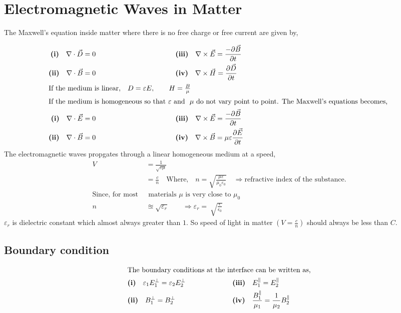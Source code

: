 \section{Electromagnetic Waves in Matter}
The Maxwell's equation inside matter where there is no free charge or free current are given by,

\begin{align*}
\textbf{(i)}\quad \nabla\cdot \vec{D}=0&\hspace{4cm}\textbf{(iii)} \quad\nabla\times \vec{E}=\frac{-\partial \vec{B}}{\partial t}\\
\textbf{(ii)}\quad\nabla\cdot \vec{B}=0&\hspace{4cm}\textbf{(iv)}\quad\nabla\times \vec{H}=\frac{\partial \vec{D}}{\partial t}\\
\intertext{If the medium is linear,\quad $ D=\varepsilon E,\qquad H=\frac{B}{\mu} $}
\intertext{If the medium is homogeneous so that $ \varepsilon $\ and \ $ \mu$\ do not vary point to point. The Maxwell's equations becomes, }
\textbf{(i)}\quad \nabla\cdot \vec{E}=0&\hspace{4cm}\textbf{(iii)} \quad\nabla\times \vec{E}=\frac{-\partial \vec{B}}{\partial t}\\
\textbf{(ii)}\quad\nabla\cdot \vec{B}=0&\hspace{4cm}\textbf{(iv)}\quad\nabla\times \vec{B}= \mu \varepsilon\frac{\partial \vec{E}}{\partial t}
\end{align*}
The electromagnetic waves propgates through a linear homogeneous medium at a speed,
\begin{align*}
V&=\frac{1}{\sqrt{\varepsilon\mu}}\\
&=\frac{c}{n}\quad\text{Where,}\quad n= \sqrt{\frac{\mu \varepsilon}{\mu_0 \varepsilon_0}} \quad \Rightarrow \text{refractive index of the substance.}\\
\text{Since, for most   }&\text{ materials \ $\mu$ is very close to  $\mu_{0}$} \\
n& \approxeq \sqrt{\varepsilon_r}\qquad \Rightarrow \varepsilon_r= \ \sqrt{\frac{\epsilon}{\epsilon_{0}}}
\end{align*}
$\varepsilon_r$ is dielectric constant which almost always greater than $1$. So speed of light in matter $(V=\frac{c}{n})$ should always be less than $C$.\\
\subsection{Boundary condition}\label{boundary condition1}
\begin{align*}
\intertext{The boundary conditions at the interface can be written as,}
&\textbf{(i)}\quad\varepsilon_1E^\perp_1=  \varepsilon_2E^\perp_2 \hspace{2cm}  &&\textbf{(iii)}\quad E^\parallel_1= E^\parallel_2\\
&\textbf{(ii)}\quad B^\perp_1= B^\perp_2
\hspace{2cm}  &&\textbf{(iv)}\quad \frac{B^\parallel_1}{\mu_{1}}=  \frac{1}{\mu_{2}}B^\parallel_2
\end{align*}
